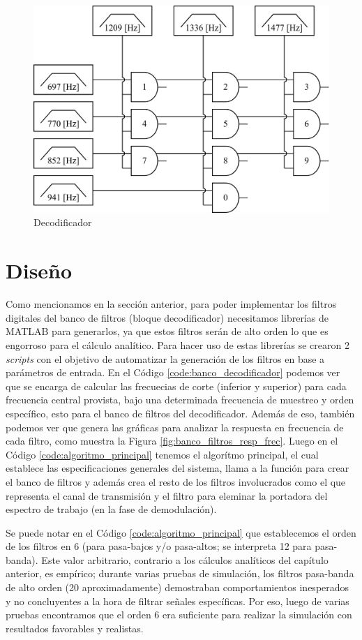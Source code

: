 \begin{figure}[!htb]
  \centering
  \includegraphics[width=350pt]{images/desarrollo/decod.png}
  \caption{Decodificador}
  \label{fig:bloques_decod}
\end{figure}

\section{Diseño}
Como mencionamos en la sección anterior, para poder implementar los filtros digitales del banco de filtros (bloque decodificador) necesitamos librerías de MATLAB para generarlos, ya que estos filtros serán de alto orden lo que es engorroso para el cálculo analítico. Para hacer uso de estas librerías se crearon 2 \textit{scripts} con el objetivo de automatizar la generación de los filtros en base a parámetros de entrada. En el Código \ref{code:banco_decodificador} podemos ver que se encarga de calcular las frecuecias de corte (inferior y superior) para cada frecuencia central provista, bajo una determinada frecuencia de muestreo y orden específico, esto para el banco de filtros del decodificador. Además de eso, también podemos ver que genera las gráficas para analizar la respuesta en frecuencia de cada filtro, como muestra la Figura \ref{fig:banco_filtros_resp_frec}. Luego en el Código \ref{code:algoritmo_principal} tenemos el algorítmo principal, el cual establece las especificaciones generales del sistema, llama a la función para crear el banco de filtros y además crea el resto de los filtros involucrados como el que representa el canal de transmisión y el filtro para eleminar la portadora del espectro de trabajo (en la fase de demodulación).

Se puede notar en el Código \ref{code:algoritmo_principal} que establecemos el orden de los filtros en 6 (para pasa-bajos y/o pasa-altos; se interpreta 12 para pasa-banda). Este valor arbitrario, contrario a los cálculos analíticos del capítulo anterior, es empírico; durante varias pruebas de simulación, los filtros pasa-banda de alto orden (20 aproximadamente) demostraban comportamientos inesperados y no concluyentes a la hora de filtrar señales específicas. Por eso, luego de varias pruebas encontramos que el orden 6 era suficiente para realizar la simulación con resultados favorables y realistas.

